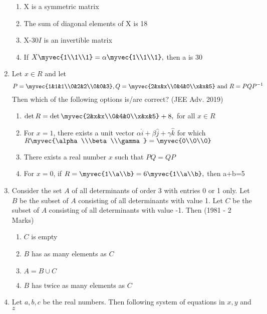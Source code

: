 \begin{enumerate}
\begin{enumerate}
	\item X is a symmetric matrix
	\item The sum of diagonal elements of X is 18
	\item X-30$I$ is an invertible matrix
	\item If $X\myvec{1\\1\\1}=\alpha\myvec{1\\1\\1},$ then a is 30\\[2pt]
\end{enumerate}

\item Let $x\in R$ and let
$$P = \myvec{1&1&1\\0&2&2\\0&0&3},Q = \myvec{2&x&x\\0&4&0\\x&x&5} \text{ and }R=PQP^{-1}$$
Then which of the following options is/are correct? \hfill (JEE Adv. 2019)


\begin{enumerate}
\item $\det R = \det\myvec{2&x&x\\0&4&0\\x&x&5}+8,$ for all $x\in R$
\item For $x=1$, there exists a unit vector $\alpha\hat{i}+\beta\hat{j}+\gamma\hat{k}$ for which $R\myvec{\alpha\\\beta\\\gamma}=\myvec{0\\0\\0}$
		\item There exists a real number $x$ such that $PQ = QP$
		\item For $x=0$, if $R=\myvec{1\\a\\b}=6\myvec{1\\a\\b},$ then a+b=5\\[2pt]
\end{enumerate}
	\item Consider the set $A$ of all determinants of order 3 with entries
		0 or 1 only. Let $B$ be the subset of $A$ consisting of all
		determinants with value 1. Let $C$ be the subset of $A$ consisting
		of all determinants with value -1. Then
		\hfill (1981 - 2 Marks)
		\begin{multicols}{2}
			\begin{enumerate}
				\item $C$ is empty
				\item $B$ has as many elements as $C$
				\item $A = B \cup C$
				\item $B$ has twice as many elements as $C$
			\end{enumerate}
		\end{multicols}
	\item Let $a, b, c$ be the real numbers. Then following system of
		equations in $x, y$ and $z$ 


\end{enumerate}
